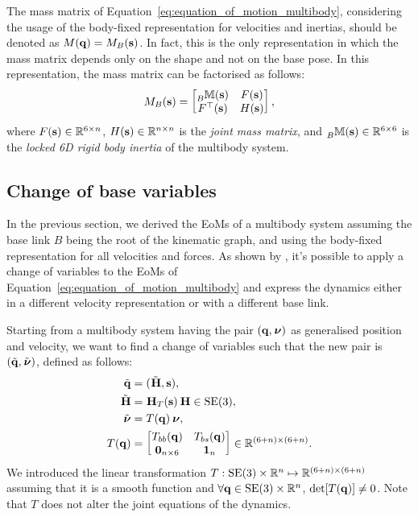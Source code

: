 \begin{remark*}
\label{remark:mass_matrix_structure}
%
The mass matrix of Equation~\eqref{eq:equation_of_motion_multibody}, considering the usage of the body-fixed representation for velocities and inertias, should be denoted as $M(\Qu) = M_B(\Shape)$.
In fact, this is the only representation in which the mass matrix depends only on the shape and not on the base pose.
In this representation, the mass matrix can be factorised as follows:
%
\begin{equation*}
    M_B(\Shape) =
    \begin{bmatrix}
        \masssix[B](\Shape) & F(\Shape) \\
        F^\top(\Shape) & H(\Shape)
    \end{bmatrix}
    ,
\end{equation*}
%
where $F(\Shape) \in \realn^{6\times n}$, $H(\Shape) \in \realn^{n\times n}$ is the \emph{joint mass matrix}, and $\masssix[B](\Shape) \in \realn^{6\times 6}$ is the \emph{locked 6D rigid body inertia} of the multibody system.
%
\end{remark*}

\subsection{Change of base variables}
\label{sec:change_of_base_variables}

In the previous section, we derived the \acp{EoM} of a multibody system assuming the base link $B$ being the root of the kinematic graph, and using the body-fixed representation for all velocities and forces.
As shown by \textcite[Section~3.6]{traversaro_modelling_2017}, it's possible to apply a change of variables to the \acp{EoM} of Equation~\eqref{eq:equation_of_motion_multibody} and express the dynamics either in a different velocity representation or with a different base link.

Starting from a multibody system having the pair $(\Qu, \Nu)$ as generalised position and velocity, we want to find a change of variables such that the new pair is $(\tilde{\Qu}, \tilde{\Nu})$, defined as follows: 
%
\begin{align*}
    \tilde{\Qu} &= (\Tilde{\homo}, \Shape) ,\\
    \tilde{\homo} &= \homo_T(\Shape) \homo \in \SE(3) ,\\
    \tilde{\Nu} &= T(\Qu) \Nu ,\\
    T(\Qu) &=
    \begin{bmatrix}
        T_{bb}(\Qu) & T_{bs}(\Qu) \\
        \zeros_{n\times6} & \ones_{n}
    \end{bmatrix} \in \realn^{(6+n)\times(6+n)}
    .
\end{align*}
%
We introduced the linear transformation $T: \SE(3)\times\realn^n \mapsto \realn^{(6+n)\times(6+n)}$ assuming that it is a smooth function and $\forall \Qu \in \SE(3)\times\realn^n$, $\det[T(\Qu)] \neq 0$.
Note that $T$ does not alter the joint equations of the dynamics.

